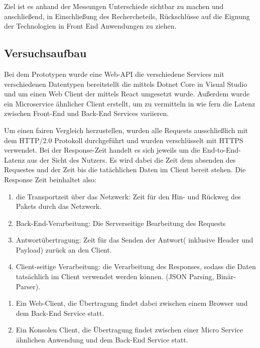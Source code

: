 Ziel ist es anhand der Messungen Unterschiede sichtbar zu machen und anschließend, in Einschließung des Rechercheteils, Rückschlüsse auf die Eignung der Technologien in Front End Anwendungen zu ziehen.

\subsection{Versuchsaufbau}
Bei dem Prototypen wurde eine Web-API die verschiedene Services mit verschiedenen Datentypen bereitstellt die mittels Dotnet Core in Visual Studio und um einen Web Client der mittels React umgesetzt wurde. Außerdem wurde ein Microservice ähnlicher Client erstellt, um zu vermitteln in wie fern die Latenz zwischen Front-End und Back-End Services variieren.

Um einen fairen Vergleich herzustellen, wurden alle Requests ausschließlich mit dem HTTP/2.0 Protokoll durchgeführt und wurden verschlüsselt mit HTTPS verwendet. Bei der Response-Zeit handelt es sich jeweils um die End-to-End-Latenz aus der Sicht des Nutzers. Es wird dabei die Zeit dem absenden des Requestes und der Zeit bis die tatächlichen Daten im Client bereit stehen. Die Response Zeit beinhaltet also: 

\begin{enumerate}
	\item die Transportzeit über das Netzwerk:
	Zeit für den Hin- und Rückweg des Pakets durch das Netzwerk.
	
	\item Back-End-Verarbeitung:
	Die Serverseitige Bearbeitung des Requests
	
	\item Antwortübertragung:
	Zeit für das Senden der Antwort( inklusive Header und Payload) zurück an den Client.
	
	\item Client-seitige Verarbeitung:
	die Verarbeitung des Responses, sodass die Daten tatsächlich im Client verwendet werden können. (JSON Parsing, Binär-Parser).
	
\end{enumerate}

\begin{enumerate}
	\item Ein Web-Client, die Übertragung findet dabei zwischen einem Browser und dem Back-End Service statt. 
	\item Ein Konsolen Client, die Übertragung findet zwischen einer Micro Service ähnlichen Anwendung und dem Back-End Service statt. 
	
\end{enumerate}

